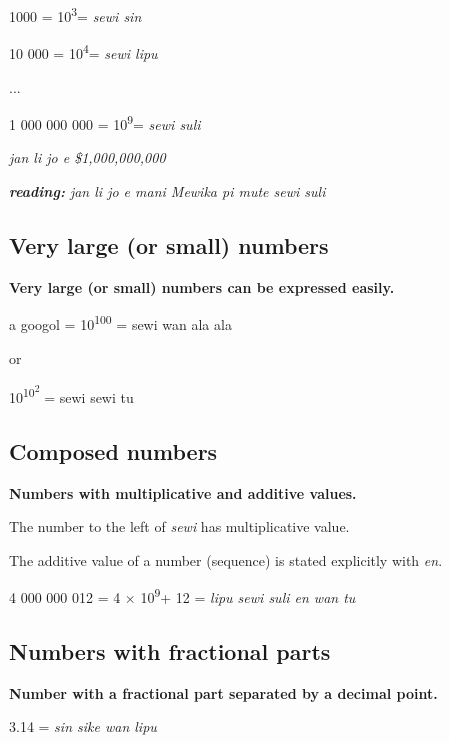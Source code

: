 \documentclass{article}
\begin{document}
	1000 = 10\textsuperscript{3}= \emph{sewi sin}
	
	10 000 = 10\textsuperscript{4}= \emph{sewi lipu}
	
	...
	
	1 000 000 000 = 10\textsuperscript{9}= \emph{sewi suli}
	
\vspace {12 pt}
	
	\emph{jan li jo e \$1,000,000,000}
	
	\emph{\textbf{reading:} jan li jo e mani Mewika pi mute sewi suli}
	
\subsection{Very large (or small) numbers}

   \textbf{ Very large (or small) numbers can be expressed easily.}
    
    \vspace {6 pt}
	
	a googol = 10\textsuperscript{100} = sewi wan ala ala 
	
	or 
	
	10\textsuperscript{10\textsuperscript{2}} = sewi sewi tu
	
	\subsection{Composed numbers}
	
	\textbf{Numbers with multiplicative and additive values.}
	
	\vspace {6 pt}
	
	The number to the left of \emph{sewi} has multiplicative value.
	
		\vspace{5pt}
	
	The additive value of a number (sequence) is stated explicitly with
	\emph{en}.
   \vspace {6 pt}
   	
	4 000 000 012 = 4 × 10\textsuperscript{9}+ 12 = \emph{lipu sewi suli en
		wan tu}
	
	\subsection{Numbers with fractional parts}
	
	\textbf{Number with a fractional part separated by a decimal point.}
	
		\vspace{5pt}
		
	3.14 = \emph{sin sike wan lipu}
	
\end{document}
